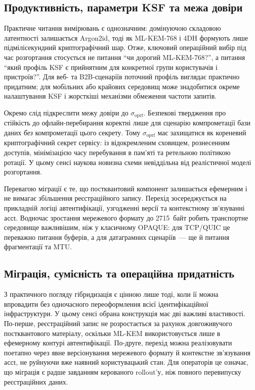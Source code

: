 \documentclass{llncs}
\newcommand{\acct}{\mathsf{acct}}
\newcommand{\sigoprf}{\sigma_{\mathrm{oprf}}}
\begin{document}
\subsection{Продуктивність, параметри KSF та межа довіри}

Практичне читання вимірювань є однозначним: домінуючою складовою
латентності залишається Argon2id, тоді як ML-KEM-768 і 4DH формують
лише підмілісекундний криптографічний шар. Отже, ключовий операційний
вибір під час розгортання стосується не питання ``чи дорогий
ML-KEM-768?'', а питання ``який профіль KSF є прийнятним для конкретної
групи користувачів і пристроїв?''. Для веб- та B2B-сценаріїв поточний
профіль виглядає практично придатним; для мобільних або крайових
середовищ може знадобитися окреме налаштування KSF і жорсткіші
механізми обмеження частоти запитів.

Окремо слід підкреслити межу довіри до $\sigoprf$. Безпекові
твердження про стійкість до офлайн-перебирання коректні лише для
сценарію компрометації бази даних \emph{без} компрометації цього
секрету. Тому $\sigoprf$ має захищатися як кореневий
криптографічний секрет сервісу: із відокремленим сховищем, рознесенням
доступів, мінімізацією часу перебування в пам'яті та ретельною політикою
ротації. У цьому сенсі наукова новизна схеми невіддільна від реалістичної
моделі розгортання.

Перевагою міграції є те, що постквантовий компонент залишається
ефемерним і не вимагає збільшення реєстраційного запису. Перехід
зосереджується на прикладній логіці автентифікації, узгодженні версії та
контекстному зв'язуванні $\acct$. Водночас зростання
мережевого формату до 2715~байт робить транспортне середовище
важливішим, ніж у класичному OPAQUE: для TCP/QUIC це переважно питання
буферів, а для датаграмних сценаріїв~--- ще й питання фрагментації та
MTU.

\subsection{Міграція, сумісність та операційна придатність}

З практичного погляду гібридизація є цінною лише тоді, коли її можна
впровадити без одночасного переоформлення всієї ідентифікаційної
інфраструктури. У цьому сенсі обрана конструкція має дві важливі
властивості. По-перше, реєстраційний запис не розростається за рахунок
довгоживучого постквантового матеріалу, оскільки ML-KEM використовується
лише в ефемерному контурі автентифікації. По-друге, перехід можна
реалізовувати поетапно через явне версіонування мережевого формату й
контекстне зв'язування $\acct$, не руйнуючи вже наявний
користувацький стан. Для операторів це означає, що міграція є радше
завданням керованого rollout'у, ніж повного перевипуску реєстраційних
даних.
\end{document}

